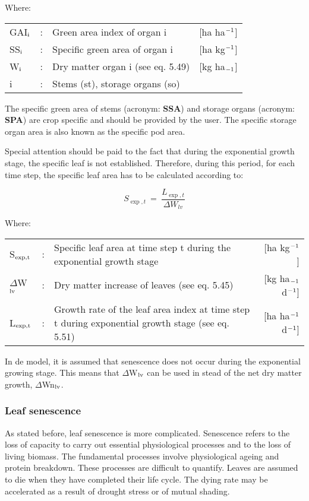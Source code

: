 Where:\\[5pt]
\begin{tabularx}{\textwidth}{llXr}
GAI$_{{\rm i}}$ &:& Green area index of organ i    &
    [ha ha$^{{\rm -1}}$]\\
SS$_{{\rm i}}$ &:& Specific green area of organ i    &
    [ha kg$^{{\rm -1}}$]\\
W$_{{\rm i}}$ &:& Dry matter organ i (see eq. 5.49)    &
    [kg ha$_{{\rm -1}}$]\\
i &:& Stems (st), storage organs (so)\\
\end{tabularx}

The specific green area of stems (acronym: {\bf SSA}) and storage organs (acronym: {\bf SPA}) are
crop specific and should be provided by the user. The specific storage organ area is also
known as the specific pod area.

Special attention should be paid to the fact that during the exponential growth stage, the
specific leaf is not established. Therefore, during this period, for each time step, the
specific leaf area has to be calculated according to:

\begin{equation}
S_{\exp,t} ~=~ {\frac{L_{\exp,t}}{\Delta W_{lv} }}
\end{equation}

Where:\\[5pt]
\begin{tabularx}{\textwidth}{llXr}
S$_{{\rm exp,t}}$ &:& Specific leaf area at time step t during the 
    exponential growth stage    &     [ha kg$^{{\rm -1}}$]\\
$\Delta$W$_{{\rm lv}}$ &:& Dry matter increase of leaves (see eq. 5.45)   &
    [kg ha$_{{\rm -1}}$ d$^{{\rm -1}}$]\\
L$_{{\rm \exp,t}}$ &:& Growth rate of the leaf area index at time step t
   during exponential growth stage (see eq. 5.51)   &
        [ha ha$^{{\rm -1}}$ d$^{{\rm -1}}$]\\
\end{tabularx}

 
In de model, it is assumed that senescence does not occur during the exponential growing
stage. This means that $\Delta$W$_{{\rm lv}}$ can be used in stead of the net dry matter growth, $\Delta$Wn$_{{\rm lv}}$.

\subsubsection{Leaf senescence}
As stated before, leaf senescence is more complicated. Senescence refers to the loss of
capacity to carry out essential physio\-logical processes and to the loss of living biomass.
The fundamental processes involve physiological ageing and protein breakdown. These
processes are difficult to quantify. Leaves are assumed to die when they have completed
their life cycle. The dying rate may be accelerated as a result of drought stress or of
mutual shading.

